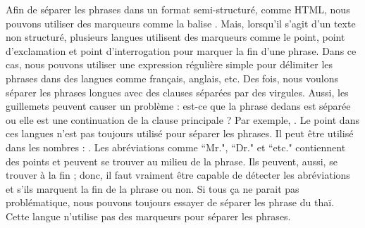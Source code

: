 \documentclass{KodeBook}
\begin{document}
Afin de séparer les phrases dans un format semi-structuré, comme HTML, nous pouvons utiliser des marqueurs comme la balise .
Mais, lorsqu'il s'agit d'un texte non structuré, plusieurs langues utilisent des marqueurs comme le point, point d'exclamation et point d'interrogation pour marquer la fin d'une phrase. 
Dans ce cas, nous pouvons utiliser une expression régulière simple \expword{/[.?!]/} pour délimiter les phrases dans des langues comme français, anglais, etc.
Des fois, nous voulons séparer les phrases longues avec des clauses séparées par des virgules.
Aussi, les guillemets peuvent causer un problème : est-ce que la phrase dedans est séparée ou elle est une continuation de la clause principale ?
Par exemple, .
Le point dans ces langues n'est pas toujours utilisé pour séparer les phrases. 
Il peut être utilisé dans les nombres : .
Les abréviations comme ``Mr.", ``Dr." et ``etc." contiennent des points et peuvent se trouver au milieu de la phrase. 
Ils peuvent, aussi, se trouver à la fin ; donc, il faut vraiment être capable de détecter les abréviations et s'ils marquent la fin de la phrase ou non. 
Si tous ça ne parait pas problématique, nous pouvons toujours essayer de séparer les phrase du thaï. 
Cette langue n'utilise pas des marqueurs pour séparer les phrases.
\end{document}

